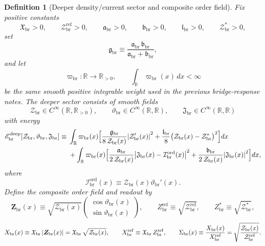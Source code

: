 \documentclass[11pt]{article}
\newcommand{\ProfWeight}{\varpi_{\mathrm{br}}}
\newcommand{\RespSus}{\Sigma_{\mathrm{br}}}
\newcommand{\RespMicro}{X_{\mathrm{br}}}
\newcommand{\RespMicroRef}{X_{\mathrm{br}}^{\mathrm{ref}}}
\newcommand{\RespOrderField}{\bm Z_{\mathrm{br}}}
\newcommand{\RespOrderRef}{Z_{\mathrm{br}}^{\mathrm{ref}}}
\newcommand{\RespOrderEq}{Z_{\mathrm{br}}^{\ast}}
\newcommand{\RespOrderCurrent}{\mathcal I_{\mathrm{br}}^{\mathrm{ord}}}
\newcommand{\RespOrderPhase}{\vartheta_{\mathrm{br}}}
\newcommand{\RespDeepDensity}{\mathcal Z_{\mathrm{br}}}
\newcommand{\RespDeepDensityRef}{\mathcal Z_{\mathrm{br}}^{\mathrm{ref}}}
\newcommand{\RespDeepDensityEq}{\mathcal Z_{\mathrm{br}}^{\ast}}
\newcommand{\RespDeepReadout}{\mathfrak X_{\mathrm{br}}}
\newcommand{\RespDeepTrack}{\mathfrak a_{\mathrm{br}}}
\newcommand{\RespDeepRelax}{\mathfrak b_{\mathrm{br}}}
\newcommand{\RespDeepStiff}{\mathfrak g_{\mathrm{br}}}
\newcommand{\RespDeepWell}{\mathfrak l_{\mathrm{br}}}
\newcommand{\RespDeepAux}{\mathfrak J_{\mathrm{br}}}
\newcommand{\RespDeepEnergy}{\mathscr E_{\mathrm{br}}^{\mathrm{deep}}}
\newtheorem{definition}{Definition}
\begin{document}
\begin{definition}[Deeper density/current sector and composite order field]
\label{def:deepsector}
Fix positive constants
\begin{equation}
\RespDeepReadout>0,
\qquad
\RespDeepDensityRef>0,
\qquad
\RespDeepTrack>0,
\qquad
\RespDeepRelax>0,
\qquad
\RespDeepWell>0,
\qquad
\RespDeepDensityEq>0,
\label{eq:deepconstants}
\end{equation}
set
\begin{equation}
\RespDeepStiff
\equiv
\frac{\RespDeepTrack\,\RespDeepRelax}{\RespDeepTrack+\RespDeepRelax},
\label{eq:deepstiff}
\end{equation}
and let
\begin{equation}
\ProfWeight:\mathbb R\to\mathbb R_{>0},
\qquad
\int_{\mathbb R}\ProfWeight(x)\,dx<\infty
\label{eq:weight}
\end{equation}
be the same smooth positive integrable weight used in the previous bridge-response notes. The deeper sector consists of smooth fields
\begin{equation}
\RespDeepDensity\in C^\infty(\mathbb R,\mathbb R_{>0}),
\qquad
\RespOrderPhase\in C^\infty(\mathbb R,\mathbb R),
\qquad
\RespDeepAux\in C^\infty(\mathbb R,\mathbb R)
\label{eq:deepfields}
\end{equation}
with energy
\begin{align}
\RespDeepEnergy[\RespDeepDensity,\RespOrderPhase,\RespDeepAux]
\equiv\;&
\int_{\mathbb R}\ProfWeight(x)\Bigl[
\frac{\RespDeepStiff}{8\,\RespDeepDensity(x)}\abs{\RespDeepDensity'(x)}^2
+
\frac{\RespDeepWell}{8}\bigl(\RespDeepDensity(x)-\RespDeepDensityEq\bigr)^2
\Bigr]dx
\nonumber\\
&+
\int_{\mathbb R}\ProfWeight(x)\Bigl[
\frac{\RespDeepTrack}{2\,\RespDeepDensity(x)}\abs{\RespDeepAux(x)-\RespOrderCurrent(x)}^2
+
\frac{\RespDeepRelax}{2\,\RespDeepDensity(x)}\abs{\RespDeepAux(x)}^2
\Bigr]dx,
\label{eq:deepenergy}
\end{align}
where
\begin{equation}
\RespOrderCurrent(x)\equiv \RespDeepDensity(x)\RespOrderPhase'(x).
\label{eq:deepcurrent}
\end{equation}
Define the composite order field and readout by
\begin{equation}
\RespOrderField(x)
\equiv
\sqrt{\RespDeepDensity(x)}
\begin{pmatrix}
\cos\RespOrderPhase(x)\\
\sin\RespOrderPhase(x)
\end{pmatrix},
\qquad
\RespOrderRef\equiv \sqrt{\RespDeepDensityRef},
\qquad
\RespOrderEq\equiv \sqrt{\RespDeepDensityEq},
\label{eq:compositeorder}
\end{equation}
\begin{equation}
\RespMicro(x)\equiv \RespDeepReadout\,\abs{\RespOrderField(x)}=\RespDeepReadout\,\sqrt{\RespDeepDensity(x)},
\qquad
\RespMicroRef\equiv \RespDeepReadout\,\RespOrderRef,
\qquad
\RespSus(x)\equiv \frac{\RespMicro(x)}{\RespMicroRef}=\sqrt{\frac{\RespDeepDensity(x)}{\RespDeepDensityRef}}.
\label{eq:deepreadout}
\end{equation}
\end{definition}
\end{document}
